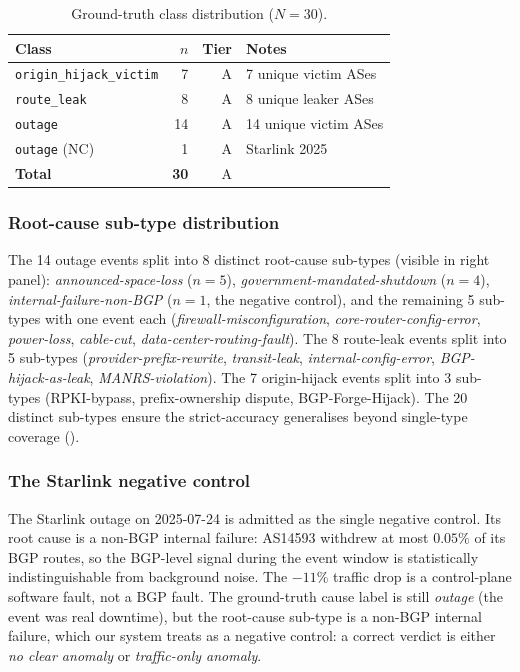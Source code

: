 \begin{table}[t]
\centering
\caption{Ground-truth class distribution
($N{=}30$).}
\label{tab:dataset-distribution}
\small
\begin{tabular}{lrrl}
\hline
Class & $n$ & Tier & Notes \\ \hline
\texttt{origin\_hijack\_victim} & 7 & A & 7 unique victim ASes \\
\texttt{route\_leak} & 8 & A & 8 unique leaker ASes \\
\texttt{outage} & 14 & A & 14 unique victim ASes \\
\texttt{outage} (NC) & 1 & A & Starlink 2025 \\
\hline
\textbf{Total} & \textbf{30} & A & \\
\hline
\end{tabular}
\end{table}

\subsubsection{Root-cause sub-type distribution}
\label{sec:dataset-subtypes}

The 14 outage events split into 8 distinct root-cause
sub-types (visible in  right
panel): \emph{announced-space-loss} ($n=5$),
\emph{government-mandated-shutdown} ($n=4$),
\emph{internal-failure-non-BGP} ($n=1$, the negative control),
and the remaining 5 sub-types with one event each
(\emph{firewall-misconfiguration},
\emph{core-router-config-error}, \emph{power-loss},
\emph{cable-cut}, \emph{data-center-routing-fault}).
The 8 route-leak events split into 5 sub-types
(\emph{provider-prefix-rewrite}, \emph{transit-leak},
\emph{internal-config-error}, \emph{BGP-hijack-as-leak},
\emph{MANRS-violation}). The 7 origin-hijack events
split into 3 sub-types (RPKI-bypass, prefix-ownership
dispute, BGP-Forge-Hijack). The 20 distinct sub-types
ensure the strict-accuracy generalises beyond
single-type coverage ().

\subsubsection{The Starlink negative control}
\label{sec:neg-trl}

The Starlink outage on 2025-07-24 is admitted as the single
negative control. Its root cause is a non-BGP internal failure:
AS14593 withdrew at most $0.05\%$ of its BGP routes, so the
BGP-level signal during the event window is statistically
indistinguishable from background noise. The $-11\%$ traffic
drop is a control-plane software fault, not a BGP fault. The
ground-truth cause label is still \emph{outage} (the event was
real downtime), but the root-cause sub-type is a non-BGP
internal failure, which our system treats as a negative
control: a correct verdict is either \emph{no clear anomaly}
or \emph{traffic-only anomaly}.

